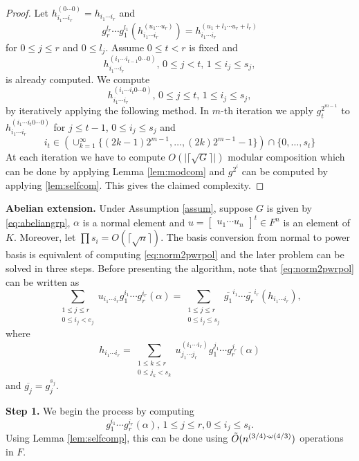 \begin{proof}
Let $h_{i_1 \cdots i_r}^{(0 \cdots 0)} = h_{i_1 \cdots i_r}$ and $$g_r^{l_r} \cdots g_1^{l_1}(h_{i_1 \cdots i_r}^{(u_1 \cdots u_r)}) = h_{i_1 \cdots i_r}^{(u_1+l_1 \cdots u_r+l_r)}$$ for $0 \leq j \leq r$ and $0 \leq l_j$.
Assume $0 \leq t < r$ is fixed and $$h_{i_1 \cdots i_r}^{(i_1 \cdots i_{t-1}0 \cdots 0)}, \, 0 \leq j < t, \, 
1 \leq i_j \leq s_j,$$ is already computed. We compute 
$$h_{i_1 \cdots i_r}^{(i_1 \cdots i_{t}0 \cdots 0)}, \, 0 \leq j \leq t, \, 1 \leq i_j \leq s_j,$$
by iteratively applying the following method. In $m$-th iteration we apply $g_t^{2^{m-1}}$ to $h_{i_1 \cdots i_r}^{(i_1 \cdots i_{t}0 \cdots 0)}$ for $j \leq t-1$, $0 \leq i_j \leq s_j$ and 
$$i_t \in \left(\cup_{k = 1}^{\infty} \lbrace (2k-1)2^{m-1}, \ldots , (2k)2^{m-1}-1 \rbrace\right) \cap \lbrace 0 , \ldots , s_t \rbrace $$
At each iteration we have to compute $O(\vert \lceil \sqrt{G} \rceil \vert)$ modular composition which can be done by applying
Lemma \ref{lem:modcom} and $g^{2^i}$ can be computed by applying \ref{lem:selfcom}. This gives the claimed complexity.
\end{proof}

\textbf{Abelian extension.} Under Assumption \ref{assum}, suppose $G$ is given by \eqref{eq:abeliangrp}, $\alpha$ is a normal
element and $u = \begin{bmatrix} u_1 \cdots u_n \end{bmatrix}^t \in F^n$ is an element of $K$. Moreover, let 
$\prod s_i = O(\lceil \sqrt{n} \rceil)$. The basis conversion from normal to power basis is equivalent of computing \eqref{eq:norm2pwrpol} and
the later problem can be solved in three steps. Before presenting the algorithm, note that \eqref{eq:norm2pwrpol} can be written
as 
$$\sum_{\substack{1 \leq j \leq r\\ 0 \leq i_j < e_j}} u_{i_1 \cdots i_r} g_1^{i_1} \cdots g_r^{i_r}(\alpha) = \sum_{\substack{1 \leq j \leq r\\ 0 \leq i_j \leq s_j}} \overline{g_1}^{i_1} \cdots \overline{g_r}^{i_r} (h_{i_1 \cdots i_r}),$$ 
where $$h_{i_1 \cdots i_r} = \sum_{\substack{1 \leq k \leq r\\ 0 \leq j_k < s_k}} u^{(i_1 \cdots i_r)}_{j_1 \cdots j_r}
g_1^{j_1} \cdots g_r^{j_r}(\alpha)$$ and $\overline{g_j} = g_j^{s_j}$.

\textbf{Step 1.} We begin the process by computing $$g_1^{i_1} \cdots g_r^{i_r}(\alpha), \, 1 \leq j \leq r, 0 \leq i_j \leq s_i.$$
Using Lemma \ref{lem:selfcomp}, this can be done using $\tilde{O}(n^{(3/4)\cdot \omega(4/3)})$ operations in $F$.

